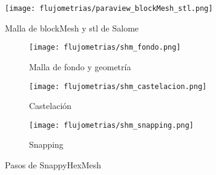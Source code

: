 \begin{figure}
    \centering
    \texttt{[image: flujometrias/paraview\_blockMesh\_stl.png]}
    \caption{Malla de blockMesh y stl de Salome}\label{fig:paraview_blockMesh_stl}
\end{figure}

\begin{figure}[t!]
    \centering
    \begin{subfigure}[t]{0.5\textwidth}
        \centering
        \texttt{[image: flujometrias/shm\_fondo.png]}
        \caption{Malla de fondo y geometría}
    \end{subfigure}%
    \begin{subfigure}[t]{0.5\textwidth}
        \centering
        \texttt{[image: flujometrias/shm\_castelacion.png]}
        \caption{Castelación}
    \end{subfigure}
    \begin{subfigure}[t]{0.5\textwidth}
        \centering
        \texttt{[image: flujometrias/shm\_snapping.png]}
        \caption{Snapping}
    \end{subfigure}
    \caption{Pasos de SnappyHexMesh\parencite{shm_steps}}\label{fig:openfoam_shm_pasos}
\end{figure}








